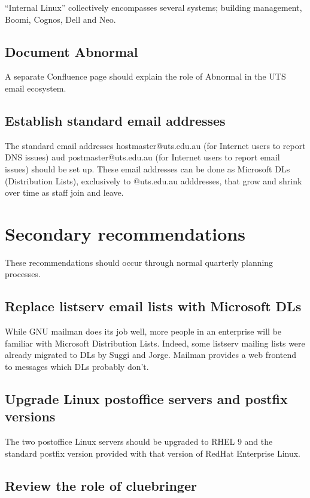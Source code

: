 \documentclass{article}
\begin{document}
``Internal Linux'' collectively encompasses several systems; building
management, Boomi, Cognos, Dell and Neo.

\subsection{Document Abnormal}

A separate Confluence page should explain the role of Abnormal in the
UTS email ecosystem.

\subsection{Establish standard email addresses}

The standard email addresses hostmaster@uts.edu.au (for Internet users
to report DNS issues) aud postmaster@uts.edu.au (for Internet users to
report email issues) should be set up. These email addresses can be
done as Microsoft DLs (Distribution Lists), exclusively to @uts.edu.au
adddresses, that grow and shrink over time as staff join and leave.

\section{Secondary recommendations}

These recommendations should occur through normal quarterly planning
processes.

\subsection{Replace listserv email lists with Microsoft DLs}

While GNU mailman does its job well, more people in an enterprise will
be familiar with Microsoft Distribution Lists. Indeed, some listserv
mailing lists were already migrated to DLs by Suggi and Jorge. Mailman
provides a web frontend to messages which DLs probably don't.

\subsection{Upgrade Linux postoffice servers and postfix versions}

The two postoffice Linux servers should be upgraded to RHEL 9 and the
standard postfix version provided with that version of RedHat
Enterprise Linux.

\subsection{Review the role of cluebringer}
\end{document}

